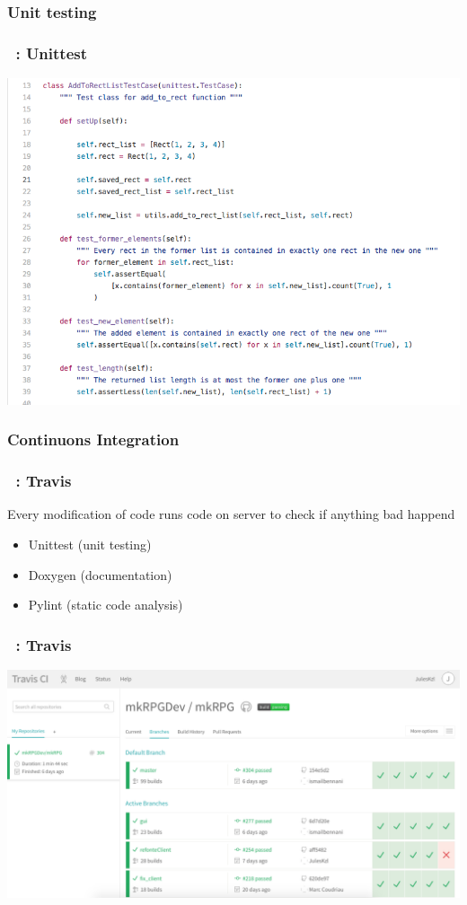 \documentclass[11pt]{beamer}
\begin{document}
\subsubsection{Unit testing}
\begin{frame}
    \frametitle{\secname~: Unittest}
\includegraphics[scale=0.4]{unittest}
\end{frame}

\subsubsection{Continuons Integration}
\begin{frame}
    \frametitle{\secname~: Travis}
    Every modification of code runs code on server to check if anything bad happend
    \begin{itemize}
    	 \item Unittest (unit testing)
        \item Doxygen (documentation)
        \item Pylint (static code analysis)
    \end{itemize}
\end{frame}

\begin{frame}
    \frametitle{\secname~: Travis}
\includegraphics[scale=0.3]{travis}
\end{frame}
\end{document}
